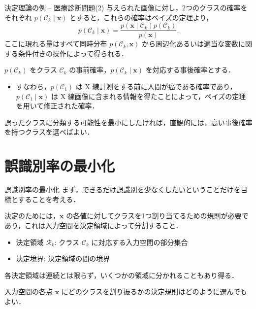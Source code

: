 \documentclass[uplatex,11pt,dvipdfmx,aspectratio=169,unicode,t]{beamer}
\numberwithin{equation}{section}
\newcommand{\CC}{\mathcal{C}}
\newcommand{\CR}{\mathcal{R}}
\newcommand{\bs}[1]{\boldsymbol{#1}}
\newcommand{\1}{\bs{1}}
\newcommand{\0}{\bs{0}}
\begin{document}
\begin{frame}{決定理論の例 -- 医療診断問題(2)}
    与えられた画像に対し，2つのクラスの確率をそれぞれ $p(\CC_{k} \mid \bs{x})$ とすると，これらの確率はベイズの定理より，
    \begin{equation}
        p(\CC_{k} \mid \bs{x}) = \frac{p(\bs{x} \mid \CC_{k}) p(\CC_{k})}{p(\bs{x})}.
    \end{equation}
    ここに現れる量はすべて同時分布 $p(\CC_{k},\bs{x})$ から周辺化あるいは適当な変数に関する条件付きの操作によって得られる．
    
    $p(\CC_{k})$ をクラス $\CC_{k}$ の事前確率，$p(\CC_{k} \mid \bs{x})$ を対応する事後確率とする．
    \begin{itemize}
        \item すなわち，$p(\CC_{1})$ は X 線計測をする前に人間が癌である確率であり，$p(\CC_{1} \mid \bs{x})$ は X 線画像に含まれる情報を得たことによって，ベイズの定理を用いて修正された確率．
    \end{itemize}
    
    誤ったクラスに分類する可能性を最小にしたければ，直観的には，高い事後確率を持つクラスを選べばよい．
\end{frame}

\section{誤識別率の最小化}

\begin{frame}{誤識別率の最小化}
    まず，\underline{できるだけ誤識別を少なくしたい}ということだけを目標とすることを考える．
    
    決定のためには，$\bs{x}$ の各値に対してクラスを1つ割り当てるための規則が必要であり，これは入力空間を決定領域によって分割すること．
    \begin{itemize}
        \item 決定領域 $\CR_{k}$: クラス $\CC_{k}$ に対応する入力空間の部分集合
        \item 決定境界: 決定領域の間の境界
    \end{itemize}
    各決定領域は連続とは限らず，いくつかの領域に分かれることもあり得る．

    入力空間の各点 $\bs{x}$ にどのクラスを割り振るかの決定規則はどのように選んでもよい．
\end{frame}
\end{document}
